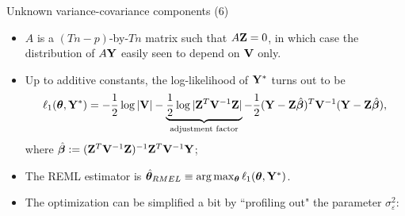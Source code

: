 \documentclass{beamer}
\newcommand{\boldbeta}{{\boldsymbol \beta}}
\newcommand{\boldtheta}{{\boldsymbol \theta}}
\newcommand{\boldZ}{{\bf Z}}
\newcommand{\boldV}{{\bf V}}
\newenvironment{wideitemize}%
  {\begin{itemize}%
    \setlength{\parskip}{1em}}%
  {\end{itemize}}
\begin{document}
\begin{frame}{Unknown variance-covariance components (6)}

\begin{wideitemize}


 

\item  $A$ is a $(Tn - p)$-by-$Tn$ matrix such that $A {\bf Z} = 0$, in which case the distribution of $A{\bf Y}$ easily seen to depend on ${\bf V}$ only.

\item Up to additive constants, the log-likelihood of ${\bf Y}^*$ turns out to be
\[
\ell_1( \boldtheta,{\bf Y}^* ) = - \frac{1}{2} \log |{\bf V} | - \underbrace{\frac{1}{2} \log |{\boldZ^T \boldV^{-1}\boldZ}|}_{\text{adjustment factor}} - \frac{1}{2} ({\bf Y} - {\bf Z} \hat{\boldbeta})^T  {\bf V}^{-1} ({\bf Y} - {\bf Z} \hat{\boldbeta}),
\]
where $\hat{\boldbeta} := {(\boldZ^T \boldV^{-1}\boldZ)^{-1} \boldZ^T \boldV^{-1} }{\bf Y}$; 
\item  The REML estimator is $\hat{\boldsymbol \theta}_{RMEL} \equiv \arg\max_{\boldsymbol \theta} \ell_1( {\boldsymbol \theta},{\bf Y}^* )$.

\item The optimization can be simplified a bit by ``profiling out" the parameter $\sigma_\varepsilon^2$:

\end{wideitemize}
\end{frame}
\end{document}
